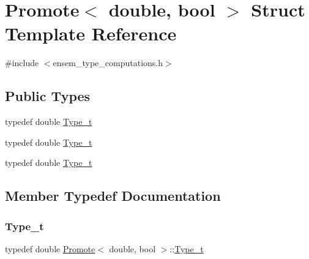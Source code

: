 \hypertarget{structPromote_3_01double_00_01bool_01_4}{}\section{Promote$<$ double, bool $>$ Struct Template Reference}
\label{structPromote_3_01double_00_01bool_01_4}


{\ttfamily \#include $<$ensem\+\_\+type\+\_\+computations.\+h$>$}

\subsection*{Public Types}
\begin{DoxyCompactItemize}
\item 
typedef double \mbox{\hyperlink{structPromote_3_01double_00_01bool_01_4_a0daa22cf2a9d3b7070f5d6945d770c68}{Type\+\_\+t}}
\item 
typedef double \mbox{\hyperlink{structPromote_3_01double_00_01bool_01_4_a0daa22cf2a9d3b7070f5d6945d770c68}{Type\+\_\+t}}
\item 
typedef double \mbox{\hyperlink{structPromote_3_01double_00_01bool_01_4_a0daa22cf2a9d3b7070f5d6945d770c68}{Type\+\_\+t}}
\end{DoxyCompactItemize}


\subsection{Member Typedef Documentation}
\mbox{\label{structPromote_3_01double_00_01bool_01_4_a0daa22cf2a9d3b7070f5d6945d770c68}} 
\subsubsection{\texorpdfstring{Type\_t}{Type\_t}\hspace{0.1cm}{\footnotesize\ttfamily [1/3]}}
{\footnotesize\ttfamily typedef double \mbox{\hyperlink{structPromote}{Promote}}$<$ double, bool $>$\+::\mbox{\hyperlink{structPromote_3_01double_00_01bool_01_4_a0daa22cf2a9d3b7070f5d6945d770c68}{Type\+\_\+t}}}

\mbox{\label{structPromote_3_01double_00_01bool_01_4_a0daa22cf2a9d3b7070f5d6945d770c68}} 

